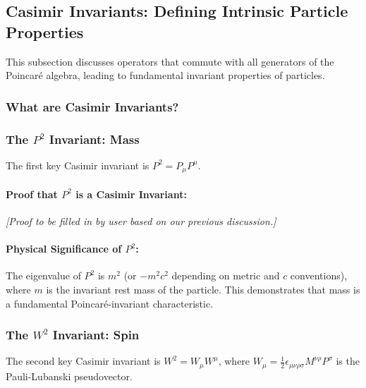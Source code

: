 \documentclass{amsart}
\theoremstyle{definition}
\theoremstyle{remark}
\begin{document}
\subsection{Casimir Invariants: Defining Intrinsic Particle Properties}
\label{subsec:casimir_invariants}
This subsection discusses operators that commute with all generators of the Poincaré algebra, leading to fundamental invariant properties of particles.

\subsubsection{What are Casimir Invariants?}
\label{subsubsec:what_are_casimirs}

\subsubsection{The $P^2$ Invariant: Mass}
\label{subsubsec:p_squared_invariant}
The first key Casimir invariant is $P^2 = P_\mu P^\mu$.

\paragraph{Proof that $P^2$ is a Casimir Invariant:}
\textit{[Proof to be filled in by user based on our previous discussion.]}

\paragraph{Physical Significance of $P^2$:}
The eigenvalue of $P^2$ is $m^2$ (or $-m^2 c^2$ depending on metric and $c$ conventions), where $m$ is the invariant rest mass of the particle.
This demonstrates that mass is a fundamental Poincaré-invariant characteristic.

\subsubsection{The $W^2$ Invariant: Spin}
\label{subsubsec:w_squared_invariant}
The second key Casimir invariant is $W^2 = W_\mu W^\mu$, where $W_\mu = \frac{1}{2} \epsilon_{\mu\nu\rho\sigma} M^{\nu\rho} P^\sigma$ is the Pauli-Lubanski pseudovector.
\end{document}
